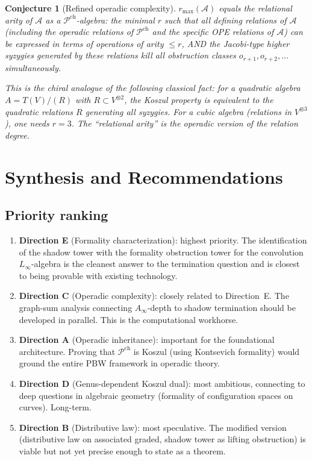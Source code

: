 \documentclass[11pt]{article}
\newtheorem{conjecture}{Conjecture}
\theoremstyle{definition}
\theoremstyle{remark}
\newcommand{\Pch}{\mathcal{P}^{\mathrm{ch}}}
\newcommand{\cA}{\mathcal{A}}
\begin{document}
\begin{conjecture}[Refined operadic complexity]
\label{conj:refined}
$r_{\max}(\cA)$ equals the \emph{relational arity} of $\cA$ as a
$\Pch$-algebra: the minimal $r$ such that all defining relations of
$\cA$ (including the operadic relations of $\Pch$ and the specific
OPE relations of $\cA$) can be expressed in terms of operations of
arity $\leq r$, AND the Jacobi-type higher syzygies generated by
these relations kill all obstruction classes $o_{r+1}, o_{r+2},
\ldots$ simultaneously.

This is the chiral analogue of the following classical fact: for
a quadratic algebra $A = T(V)/(R)$ with $R \subset V^{\otimes 2}$,
the Koszul property is equivalent to the quadratic relations $R$
generating all syzygies.  For a cubic algebra (relations in
$V^{\otimes 3}$), one needs $r = 3$.  The ``relational arity'' is
the operadic version of the relation degree.
\end{conjecture}

\section{Synthesis and Recommendations}

\subsection{Priority ranking}

\begin{enumerate}
\item \textbf{Direction E} (Formality characterization): highest
  priority.  The identification of the shadow tower with the
  formality obstruction tower for the convolution $L_\infty$-algebra
  is the cleanest answer to the termination question and is
  closest to being provable with existing technology.

\item \textbf{Direction C} (Operadic complexity): closely related
  to Direction~E.  The graph-sum analysis connecting
  $A_\infty$-depth to shadow termination should be developed in
  parallel.  This is the computational workhorse.

\item \textbf{Direction A} (Operadic inheritance): important for
  the foundational architecture.  Proving that $\Pch$ is Koszul
  (using Kontsevich formality) would ground the entire PBW framework
  in operadic theory.

\item \textbf{Direction D} (Genus-dependent Koszul dual): most
  ambitious, connecting to deep questions in algebraic geometry
  (formality of configuration spaces on curves).  Long-term.

\item \textbf{Direction B} (Distributive law): most speculative.
  The modified version (distributive law on associated graded, shadow
  tower as lifting obstruction) is viable but not yet precise enough
  to state as a theorem.
\end{enumerate}
\end{document}

